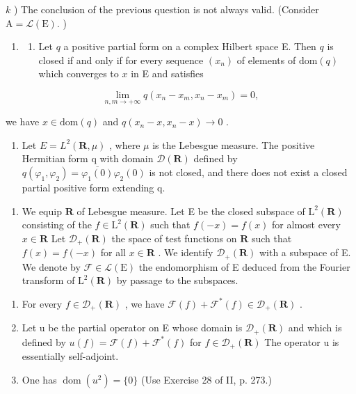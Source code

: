 \(k\) ) The conclusion of the previous question is not always valid. (Consider \(\mathrm{A} = \mathcal{L}(\mathrm{E}).\) )

\begin{enumerate}
\def\labelenumi{\arabic{enumi})}
\setcounter{enumi}{10}
\tightlist
\item
  \begin{enumerate}
  \def\labelenumii{\alph{enumii})}
  \tightlist
  \item
    Let \(q\) a positive partial form on a complex Hilbert space E. Then \(q\) is closed if and only if for every sequence \((x_{n})\) of elements of \(\text{dom}(q)\) which converges to \(x\) in E and satisfies
  \end{enumerate}
\end{enumerate}

\[
\lim _ {n, m \to + \infty} q (x _ {n} - x _ {m}, x _ {n} - x _ {m}) = 0,
\]

we have \(x \in \text{dom}(q)\) and \(q(x_{n} - x, x_{n} - x) \to 0\) .

\begin{enumerate}
\def\labelenumi{\alph{enumi})}
\setcounter{enumi}{1}
\tightlist
\item
  Let \(E = L^{2}(\mathbf{R}, \mu)\) , where \(\mu\) is the Lebesgue measure. The positive Hermitian form q with domain \(\mathcal{D}(\mathbf{R})\) defined by \(q(\varphi_{1}, \varphi_{2}) = \overline{\varphi_{1}(0)}\varphi_{2}(0)\) is not closed, and there does not exist a closed partial positive form extending q.
\end{enumerate}

\begin{enumerate}
\def\labelenumi{\arabic{enumi})}
\setcounter{enumi}{11}
\tightlist
\item
  We equip \(\mathbf{R}\) of Lebesgue measure. Let E be the closed subspace of \(\mathrm{L}^2 (\mathbf{R})\) consisting of the \(f\in \mathrm{L}^2 (\mathbf{R})\) such that \(f(-x) = f(x)\) for almost every \(x\in \mathbf{R}\) Let \(\mathcal{D}_{+}(\mathbf{R})\) the space of test functions on \(\mathbf{R}\) such that \(f(x) = f(-x)\) for all \(x\in \mathbf{R}\) . We identify \(\mathcal{D}_{+}(\mathbf{R})\) with a subspace of E. We denote by \(\mathcal{F}\in \mathcal{L}(\mathrm{E})\) the endomorphism of E deduced from the Fourier transform of \(\mathrm{L}^2 (\mathbf{R})\) by passage to the subspaces.
\end{enumerate}

\begin{enumerate}
\def\labelenumi{\alph{enumi})}
\item
  For every \(f \in \mathcal{D}_{+}(\mathbf{R})\) , we have \(\mathcal{F}(f) + \mathcal{F}^{*}(f) \in \mathcal{D}_{+}(\mathbf{R})\) .
\item
  Let u be the partial operator on E whose domain is \(\mathcal{D}_{+}(\mathbf{R})\) and which is defined by \(u(f) = \mathcal{F}(f) + \mathcal{F}^{*}(f)\) for \(f \in \mathcal{D}_{+}(\mathbf{R})\) The operator u is essentially self-adjoint.
\item
  One has \(\operatorname{dom}(u^{2})=\{0\}\) (Use Exercise 28 of II, p. 273.)
\end{enumerate}


